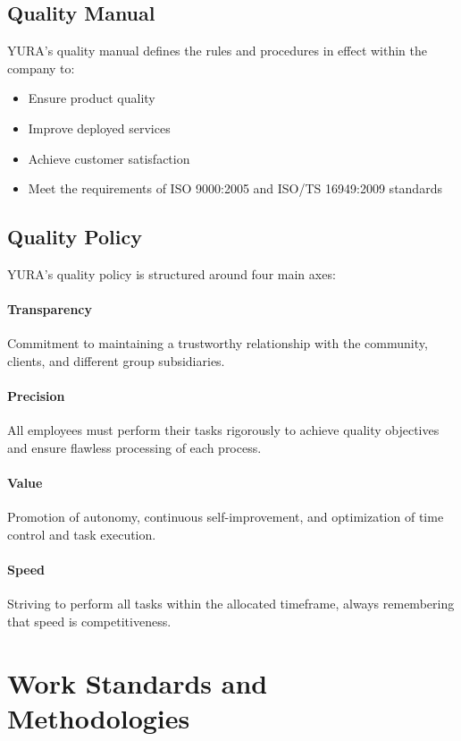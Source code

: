 \subsection{Quality Manual}

YURA's quality manual defines the rules and procedures in effect within the company to:
\begin{itemize}
    \item Ensure product quality
    \item Improve deployed services
    \item Achieve customer satisfaction
    \item Meet the requirements of ISO 9000:2005 and ISO/TS 16949:2009 standards
\end{itemize}

\subsection{Quality Policy}

YURA's quality policy is structured around four main axes:

\paragraph{Transparency}
Commitment to maintaining a trustworthy relationship with the community, clients, and different group subsidiaries.

\paragraph{Precision}
All employees must perform their tasks rigorously to achieve quality objectives and ensure flawless processing of each process.

\paragraph{Value}
Promotion of autonomy, continuous self-improvement, and optimization of time control and task execution.

\paragraph{Speed}
Striving to perform all tasks within the allocated timeframe, always remembering that speed is competitiveness.

\section{Work Standards and Methodologies}

